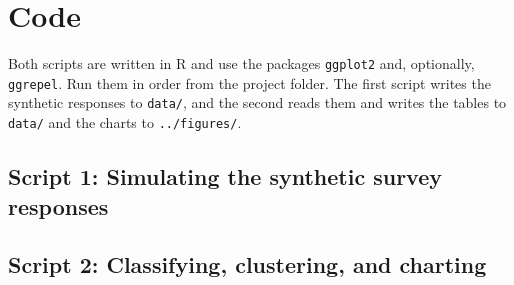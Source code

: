 \documentclass[11pt]{article}
\begin{document}
\appendix
\section{Code}\label{app:code}
Both scripts are written in R and use the packages \texttt{ggplot2} and, optionally, \texttt{ggrepel}. Run them in order from the project folder. The first script writes the synthetic responses to \texttt{data/}, and the second reads them and writes the tables to \texttt{data/} and the charts to \texttt{../figures/}.

\subsection{Script 1: Simulating the synthetic survey responses}


\subsection{Script 2: Classifying, clustering, and charting}

\end{document}
